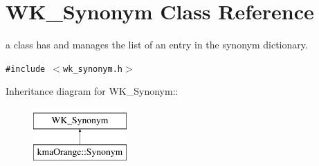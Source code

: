 \hypertarget{classWK__Synonym}{
\section{WK\_\-Synonym Class Reference}
\label{classWK__Synonym}
}
a class has and manages the list of an entry in the synonym dictionary.  


{\tt \#include $<$wk\_\-synonym.h$>$}

Inheritance diagram for WK\_\-Synonym::\begin{figure}[H]
\begin{center}
\leavevmode
\includegraphics[height=2cm]{classWK__Synonym}
\end{center}
\end{figure}

